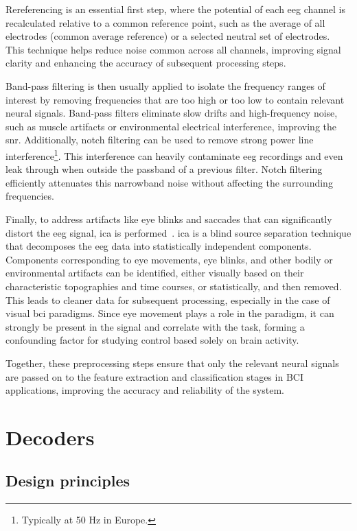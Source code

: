 Rereferencing is an essential first step, where the potential of each \ac{eeg} channel
is recalculated relative to a common reference point, such as the average of all
electrodes (common average reference) or a selected neutral set of electrodes.
This technique helps reduce noise common across all channels, improving signal clarity
and enhancing the accuracy of subsequent processing steps.

Band-pass filtering is then usually applied to isolate the frequency ranges of interest
by removing frequencies that are too high or too low to contain relevant neural signals.
Band-pass filters eliminate slow drifts and high-fre\-quen\-cy noise, such as muscle
artifacts or environmental electrical interference, improving the \ac{snr}.
Additionally, notch filtering can be used to remove strong power line interference\footnote{%
Typically at 50 Hz in Europe.}.
This interference can heavily contaminate \ac{eeg} recordings and even leak through when
outside the passband of a previous filter.
Notch filtering efficiently attenuates this narrowband noise without affecting the
surrounding frequencies.

Finally, to address artifacts like eye blinks and saccades that can significantly
distort the \ac{eeg} signal, \ac{ica} is performed~\cite{Delorme2007}.
\ac{ica} is a blind source separation technique that decomposes the \ac{eeg} data into
statistically independent components.
Components corresponding to eye movements, eye blinks, and other bodily or environmental
artifacts can be identified, either visually based on their characteristic topographies
and time courses, or statistically, and then removed.
This leads to cleaner data for subsequent processing, especially in the case of visual
\ac{bci} paradigms.
Since eye movement plays a role in the paradigm, it can strongly be present in the
signal and correlate with the task, forming a confounding factor for studying control
based solely on brain activity.

Together, these preprocessing steps ensure that only the relevant neural signals are
passed on to the feature extraction and classification stages in BCI applications,
improving the accuracy and reliability of the system.

\section{Decoders}
\label{sec:bci/decoding}

\subsection{Design principles}

